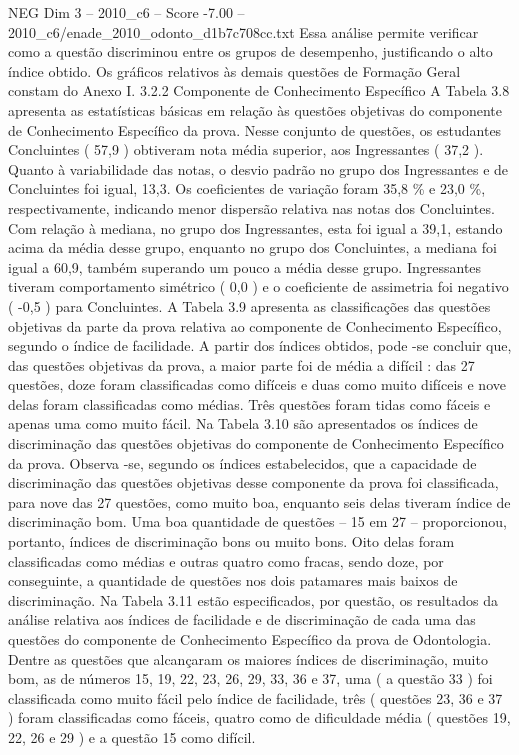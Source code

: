 \begin{textsample}{NEG Dim 3 – 2010\_c6 – Score -7.00 – 2010\_c6/enade\_2010\_odonto\_d1b7c708cc.txt}
Essa análise permite verificar como a questão discriminou entre os grupos de desempenho, justificando o alto índice obtido.
Os gráficos relativos às demais questões de Formação Geral constam do Anexo I. 3.2.2 Componente de Conhecimento Específico A Tabela 3.8 apresenta as estatísticas básicas em relação às questões objetivas do componente de Conhecimento Específico da prova.
Nesse conjunto de questões, os estudantes Concluintes ( 57,9 ) obtiveram nota média superior, aos Ingressantes ( 37,2 ).
Quanto à variabilidade das notas, o desvio padrão no grupo dos Ingressantes e de Concluintes foi igual, 13,3.
Os coeficientes de variação foram 35,8 \% e 23,0 \%, respectivamente, indicando menor dispersão relativa nas notas dos Concluintes.
Com relação à mediana, no grupo dos Ingressantes, esta foi igual a 39,1, estando acima da média desse grupo, enquanto no grupo dos Concluintes, a mediana foi igual a 60,9, também superando um pouco a média desse grupo.
Ingressantes tiveram comportamento simétrico ( 0,0 ) e o coeficiente de assimetria foi negativo ( -0,5 ) para Concluintes.
A Tabela 3.9 apresenta as classificações das questões objetivas da parte da prova relativa ao componente de Conhecimento Específico, segundo o índice de facilidade.
A partir dos índices obtidos, pode -se concluir que, das questões objetivas da prova, a maior parte foi de média a difícil : das 27 questões, doze foram classificadas como difíceis e duas como muito difíceis e nove delas foram classificadas como médias.
Três questões foram tidas como fáceis e apenas uma como muito fácil.
Na Tabela 3.10 são apresentados os índices de discriminação das questões objetivas do componente de Conhecimento Específico da prova.
Observa -se, segundo os índices estabelecidos, que a capacidade de discriminação das questões objetivas desse componente da prova foi classificada, para nove das 27 questões, como muito boa, enquanto seis delas tiveram índice de discriminação bom.
Uma boa quantidade de questões – 15 em 27 – proporcionou, portanto, índices de discriminação bons ou muito bons.
Oito delas foram classificadas como médias e outras quatro como fracas, sendo doze, por conseguinte, a quantidade de questões nos dois patamares mais baixos de discriminação.
Na Tabela 3.11 estão especificados, por questão, os resultados da análise relativa aos índices de facilidade e de discriminação de cada uma das questões do componente de Conhecimento Específico da prova de Odontologia.
Dentre as questões que alcançaram os maiores índices de discriminação, muito bom, as de números 15, 19, 22, 23, 26, 29, 33, 36 e 37, uma ( a questão 33 ) foi classificada como muito fácil pelo índice de facilidade, três ( questões 23, 36 e 37 ) foram classificadas como fáceis, quatro como de dificuldade média ( questões 19, 22, 26 e 29 ) e a questão 15 como difícil.

\end{textsample}
